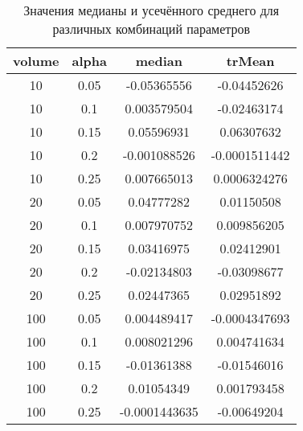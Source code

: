 \documentclass{article} %
\begin{document}
\begin{table}[H]
\centering
\begin{tabular}{|c|c|c|c|}
\hline
\textbf{volume} & \textbf{alpha} & \textbf{median} & \textbf{trMean} \\ \hline
10              & 0.05           & -0.05365556     & -0.04452626     \\ \hline
10              & 0.1            & 0.003579504     & -0.02463174     \\ \hline
10              & 0.15           & 0.05596931      & 0.06307632      \\ \hline
10              & 0.2            & -0.001088526    & -0.0001511442   \\ \hline
10              & 0.25           & 0.007665013     & 0.0006324276    \\ \hline
20              & 0.05           & 0.04777282      & 0.01150508      \\ \hline
20              & 0.1            & 0.007970752     & 0.009856205     \\ \hline
20              & 0.15           & 0.03416975      & 0.02412901      \\ \hline
20              & 0.2            & -0.02134803     & -0.03098677     \\ \hline
20              & 0.25           & 0.02447365      & 0.02951892      \\ \hline
100             & 0.05           & 0.004489417     & -0.0004347693   \\ \hline
100             & 0.1            & 0.008021296     & 0.004741634     \\ \hline
100             & 0.15           & -0.01361388     & -0.01546016     \\ \hline
100             & 0.2            & 0.01054349      & 0.001793458     \\ \hline
100             & 0.25           & -0.0001443635   & -0.00649204     \\ \hline
\end{tabular}
\caption{Значения медианы и усечённого среднего
для различных комбинаций параметров}
\end{table}
\end{document}
